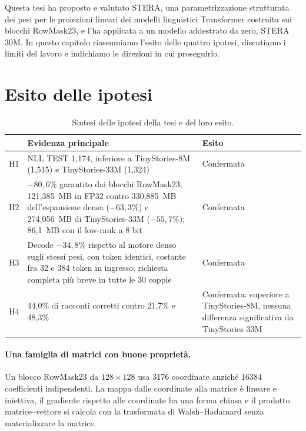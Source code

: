 Questa tesi ha proposto e valutato STERA, una parametrizzazione strutturata dei pesi per le proiezioni lineari dei modelli linguistici Transformer costruita sui blocchi RowMask23, e l'ha applicata a un modello addestrato da zero, STERA 30M. In questo capitolo riassumiamo l'esito delle quattro ipotesi, discutiamo i limiti del lavoro e indichiamo le direzioni in cui proseguirlo.

\section{Esito delle ipotesi}

\begin{table}[htbp]
\centering
\small
\begin{tabularx}{\linewidth}{lX>{\raggedright\arraybackslash}p{3.4cm}}
\toprule
& Evidenza principale & Esito \\
\midrule
H1 & NLL TEST 1,174, inferiore a TinyStories-8M (1,515) e TinyStories-33M (1,324) & Confermata \\
H2 & $-80{,}6\%$ garantito dai blocchi RowMask23; 121,385~MB in FP32 contro 330,885~MB dell'espansione densa ($-63{,}3\%$) e 274,056~MB di TinyStories-33M ($-55{,}7\%$); 86,1~MB con il low-rank a 8 bit & Confermata \\
H3 & Decode $-34{,}8\%$ rispetto al motore denso sugli stessi pesi, con token identici, costante fra 32 e 384 token in ingresso; richiesta completa più breve in tutte le 30 coppie & Confermata \\
H4 & 44,0\% di racconti corretti contro 21,7\% e 48,3\% & Confermata: superiore a TinyStories-8M, nessuna differenza significativa da TinyStories-33M \\
\bottomrule
\end{tabularx}
\caption{Sintesi delle ipotesi della tesi e del loro esito.}
\label{tab:esito-ipotesi}
\end{table}

\paragraph{Una famiglia di matrici con buone proprietà.} Un blocco RowMask23 da $128\times128$ usa \num{3176} coordinate anziché \num{16384} coefficienti indipendenti. La mappa dalle coordinate alla matrice è lineare e iniettiva, il gradiente rispetto alle coordinate ha una forma chiusa e il prodotto matrice--vettore si calcola con la trasformata di Walsh--Hadamard senza materializzare la matrice.


